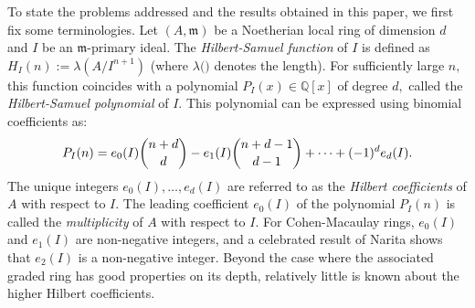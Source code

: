 \documentclass[11pt]{amsart}
\theoremstyle{plain}
\newcommand{\m}{\mathfrak{m}}
\theoremstyle{plain}
\begin{document}
To state the problems addressed and the results obtained in this paper, we first fix some terminologies. Let $(A,\mathfrak{m})$ be a Noetherian local ring of dimension $d$ and $I$ be an $\m$-primary ideal. %
 The  \textit{Hilbert-Samuel function} of $I$ is defined as $H_{I}(n):= \lambda(A/I^{n+1})$ (where $\lambda($\textunderscore$)$ denotes the length).
     For sufficiently large  $n,$ this function coincides with a polynomial $P_{I}(x) \in \mathbb Q[x]$ of degree $d,$  called the \textit{Hilbert-Samuel polynomial} of $I$.  This polynomial can be expressed using binomial coefficients as:
\begin{equation*}
    P_{I}(n)=e_{0}(I)\dbinom{n+d}{d}-e_{1}(I)\dbinom{n+d-1}{d-1}+\cdots+(-1)^{d}e_{d}(I).
\end{equation*}
The unique integers $e_{0}(I), \ldots, e_{d}(I)$ are referred to as the \textit{Hilbert  coefficients} of $A$ with respect to $I$. The leading coefficient $e_{0}(I)$ of the polynomial $P_{I}(n)$ is called the \textit{multiplicity} of $A$ with respect to $I.$ For Cohen-Macaulay rings, $e_{0}(I)$ and $e_{1}(I)$ are non-negative integers, and  a celebrated result of Narita \cite{Narita_1963} shows that  $e_{2}(I)$ is a non-negative integer. Beyond the case where the associated graded ring has good properties on its depth, relatively little is known about the higher Hilbert coefficients.
\end{document}
